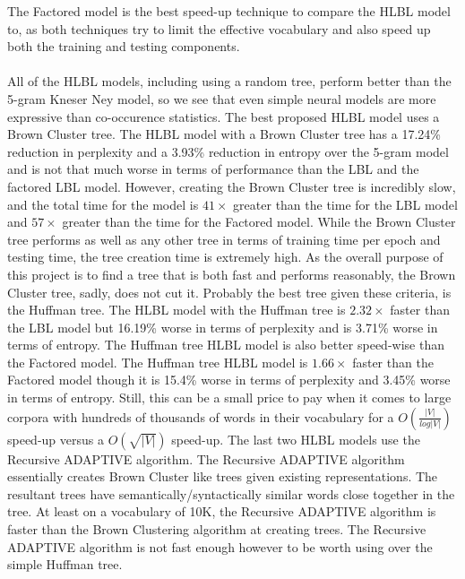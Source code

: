 The Factored model is the best speed-up technique to compare the HLBL model to, as both techniques try to limit the effective vocabulary and also speed up both the training and testing components.

\paragraph{}
All of the HLBL models, including using a random tree, perform better than the 5-gram Kneser Ney model,  so we see that even simple neural models are more expressive than co-occurence statistics. The best proposed HLBL model uses a Brown Cluster tree. The HLBL model with a Brown Cluster tree has a 17.24\% reduction in perplexity and a 3.93\% reduction in entropy over the 5-gram model and is not that much worse in terms of performance than the LBL and the factored LBL model. However, creating the Brown Cluster tree is incredibly slow, and the total time for the model is $41\times$ greater than the time for the LBL model and $57\times$ greater than the time for the Factored model. While the Brown Cluster tree performs as well as any other tree in terms of training time per epoch and testing time, the tree creation time is extremely high. As the overall purpose of this project is to find a tree that is both fast and performs reasonably, the Brown Cluster tree, sadly, does not cut it. Probably the best tree given these criteria, is the Huffman tree. The HLBL model with the Huffman tree is $2.32\times$ faster than the LBL model but 16.19\% worse in terms of perplexity and is 3.71\% worse in terms of entropy. The Huffman tree HLBL model is also better speed-wise than the Factored model. The Huffman tree HLBL model is $1.66\times$ faster than the Factored model though it is 15.4\% worse in terms of perplexity and 3.45\% worse in terms of entropy. Still, this can be a small price to pay when it comes to large corpora with hundreds of thousands of words in their vocabulary for a $O(\frac{|V|}{log|V|})$ speed-up versus a $O(\sqrt{|V|})$ speed-up. The last two HLBL models use the Recursive ADAPTIVE algorithm. The Recursive ADAPTIVE algorithm essentially creates Brown Cluster like trees given existing representations. The resultant trees have semantically/syntactically similar words close together in the tree. At least on a vocabulary of 10K, the Recursive ADAPTIVE algorithm is faster than the Brown Clustering algorithm at creating trees. The Recursive ADAPTIVE algorithm is not fast enough however to be worth using over the simple Huffman tree. 


